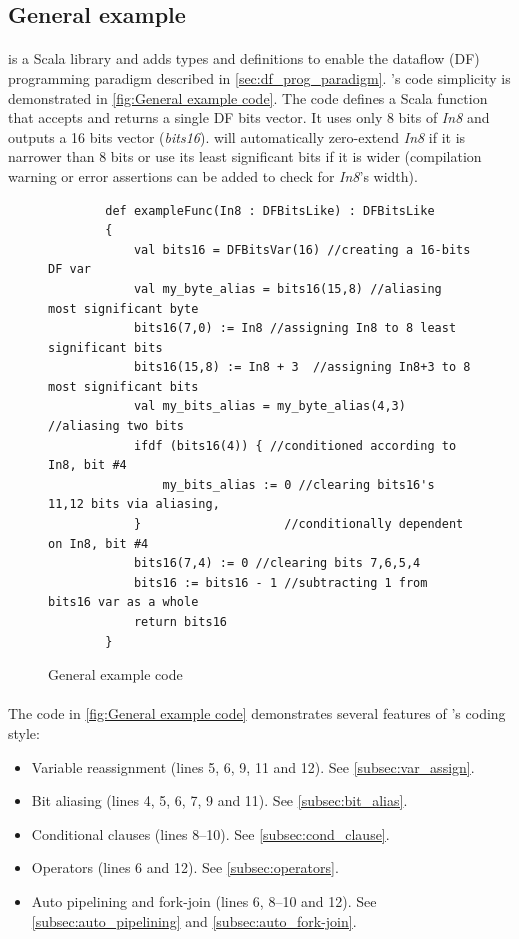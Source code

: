\subsection{General example}
\paragraph{}\cf is a Scala library and adds types and definitions to enable the dataflow (DF) programming paradigm described in \autoref{sec:df_prog_paradigm}. \cfns's code simplicity is demonstrated in \autoref{fig:General example code}. The code defines a Scala function that accepts and returns a single DF bits vector. It uses only 8 bits of \textit{In8} and outputs a 16 bits vector (\textit{bits16}). \cf will automatically zero-extend \textit{In8} if it is narrower than 8 bits or use its least significant bits if it is wider (compilation warning or error assertions can be added to check for \textit{In8}'s width).

\begin{figure}[h]
	\centering
	\begin{verbatim}
		def exampleFunc(In8 : DFBitsLike) : DFBitsLike 
		{
			val bits16 = DFBitsVar(16) //creating a 16-bits DF var
			val my_byte_alias = bits16(15,8) //aliasing most significant byte
			bits16(7,0) := In8 //assigning In8 to 8 least significant bits
			bits16(15,8) := In8 + 3  //assigning In8+3 to 8 most significant bits
			val my_bits_alias = my_byte_alias(4,3) //aliasing two bits
			ifdf (bits16(4)) { //conditioned according to In8, bit #4
				my_bits_alias := 0 //clearing bits16's 11,12 bits via aliasing, 
			}                    //conditionally dependent on In8, bit #4
			bits16(7,4) := 0 //clearing bits 7,6,5,4
			bits16 := bits16 - 1 //subtracting 1 from bits16 var as a whole
			return bits16
		}
	\end{verbatim}
	\caption{General example code}\label{fig:General example code}
\end{figure}

\paragraph{}The code in \autoref{fig:General example code} demonstrates several features of \cfns's coding style: 
\begin{itemize}
	\item Variable reassignment (lines 5, 6, 9, 11 and 12). See \autoref{subsec:var_assign}.
	\item Bit aliasing (lines 4, 5, 6, 7, 9 and 11). See \autoref{subsec:bit_alias}.
	\item Conditional clauses (lines 8--10). See \autoref{subsec:cond_clause}.
	\item Operators (lines 6 and 12). See \autoref{subsec:operators}.
	\item Auto pipelining and fork-join (lines 6, 8--10 and 12). See \autoref{subsec:auto_pipelining} and \autoref{subsec:auto_fork-join}.
\end{itemize}


